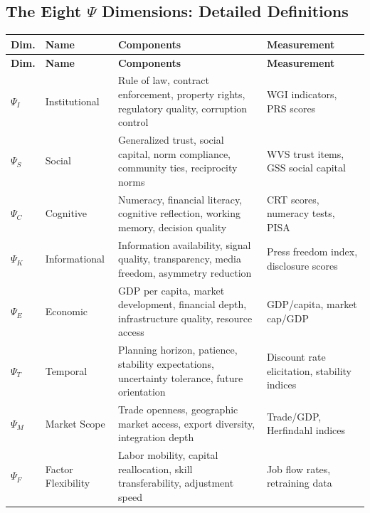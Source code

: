 \subsection{The Eight $\Psi$ Dimensions: Detailed Definitions}

\begin{center}
\renewcommand{\arraystretch}{1.3}
\begin{longtable}{lp{3cm}p{5cm}p{3cm}}
\hline
\textbf{Dim.} & \textbf{Name} & \textbf{Components} & \textbf{Measurement} \\
\hline
\endfirsthead
\hline
\textbf{Dim.} & \textbf{Name} & \textbf{Components} & \textbf{Measurement} \\
\hline
\endhead
\hline
\endfoot

$\Psi_I$ & Institutional & Rule of law, contract enforcement, property rights, regulatory quality, corruption control & WGI indicators, PRS scores \\

$\Psi_S$ & Social & Generalized trust, social capital, norm compliance, community ties, reciprocity norms & WVS trust items, GSS social capital \\

$\Psi_C$ & Cognitive & Numeracy, financial literacy, cognitive reflection, working memory, decision quality & CRT scores, numeracy tests, PISA \\

$\Psi_K$ & Informational & Information availability, signal quality, transparency, media freedom, asymmetry reduction & Press freedom index, disclosure scores \\

$\Psi_E$ & Economic & GDP per capita, market development, financial depth, infrastructure quality, resource access & GDP/capita, market cap/GDP \\

$\Psi_T$ & Temporal & Planning horizon, patience, stability expectations, uncertainty tolerance, future orientation & Discount rate elicitation, stability indices \\

$\Psi_M$ & Market Scope & Trade openness, geographic market access, export diversity, integration depth & Trade/GDP, Herfindahl indices \\

$\Psi_F$ & Factor Flexibility & Labor mobility, capital reallocation, skill transferability, adjustment speed & Job flow rates, retraining data \\
\hline

\end{longtable}
\end{center}

